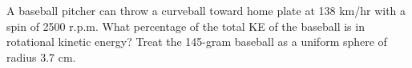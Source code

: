 A baseball pitcher can throw a curveball toward home plate at 138 km/hr
with a spin of 2500 r.p.m. What percentage of the total KE of the
baseball is in rotational kinetic energy? Treat the 145-gram baseball
as a uniform sphere of radius 3.7 cm.\answercheck

